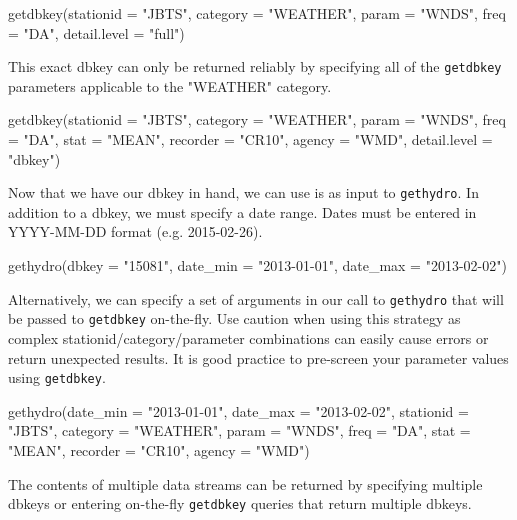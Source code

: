 \documentclass[12pt,notitlepage]{article}
\begin{document}
\begin{Schunk}
\begin{Sinput}
 getdbkey(stationid = "JBTS", category = "WEATHER", param = "WNDS",
          freq = "DA", detail.level = "full")
\end{Sinput}
\end{Schunk}

\noindent This exact dbkey can only be returned reliably by specifying all of the \texttt{getdbkey} parameters applicable to the "WEATHER" category.

\begin{Schunk}
\begin{Sinput}
 getdbkey(stationid = "JBTS", category = "WEATHER", param = "WNDS",
          freq = "DA", stat = "MEAN", recorder = "CR10", agency = "WMD",
          detail.level = "dbkey")
\end{Sinput}
\end{Schunk}

\noindent Now that we have our dbkey in hand, we can use is as input to \texttt{gethydro}. In addition to a dbkey, we must specify a date range. Dates must be entered in YYYY-MM-DD format (e.g. 2015-02-26).

\begin{Schunk}
\begin{Sinput}
 gethydro(dbkey = "15081",
          date_min = "2013-01-01", date_max = "2013-02-02")
\end{Sinput}
\end{Schunk}

\noindent Alternatively, we can specify a set of arguments in our call to \texttt{gethydro} that will be passed to \texttt{getdbkey} on-the-fly. Use caution when using this strategy as complex stationid/category/parameter combinations can easily cause errors or return unexpected results. It is good practice to pre-screen your parameter values using \texttt{getdbkey}.

\begin{Schunk}
\begin{Sinput}
 gethydro(date_min = "2013-01-01", date_max = "2013-02-02",
          stationid = "JBTS", category = "WEATHER", param = "WNDS",
          freq = "DA", stat = "MEAN", recorder = "CR10", agency = "WMD")
\end{Sinput}
\end{Schunk}

\noindent The contents of multiple data streams can be returned by specifying multiple dbkeys or entering on-the-fly \texttt{getdbkey} queries that return multiple dbkeys.
\end{document}
